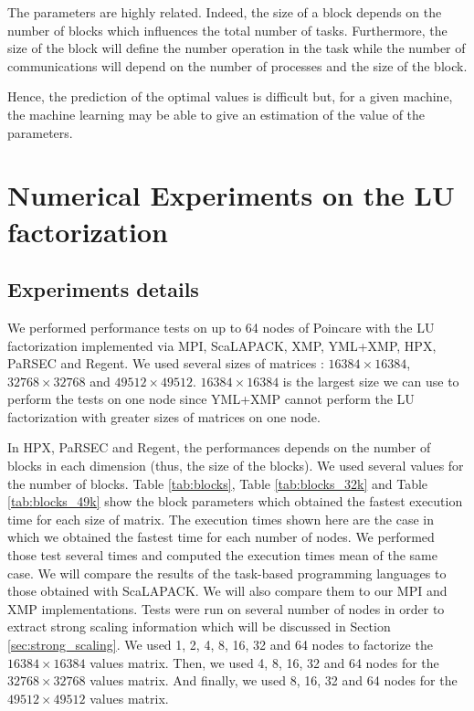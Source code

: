 The parameters are highly related.
Indeed, the size of a block depends on the number of blocks which influences the total number of tasks.
Furthermore, the size of the block will define the number operation in the task while the number of communications will depend on the number of processes and the size of the block.

Hence, the prediction of the optimal values is difficult but, for a given machine, the machine learning may be able to give an estimation of the value of the parameters.

\section{Numerical Experiments on the LU factorization}
\subsection{Experiments details}
We performed performance tests on up to 64 nodes of Poincare with the LU factorization implemented via MPI, ScaLAPACK, XMP, YML+XMP, HPX, PaRSEC and Regent.
We used several sizes of matrices : $16384 \times 16384$, $32768 \times 32768$ and $49512 \times 49512$.
$16384 \times 16384$ is the largest size we can use to perform the tests on one node since YML+XMP cannot perform the LU factorization with greater sizes of matrices on one node.

In HPX, PaRSEC and Regent, the performances depends on the number of blocks in each dimension (thus, the size of the blocks).
We used several values for the number of blocks.
Table \ref{tab:blocks}, Table \ref{tab:blocks_32k} and Table \ref{tab:blocks_49k} show the block parameters which obtained the fastest execution time for each size of matrix.
The execution times shown here are the case in which we obtained the fastest time for each number of nodes.
We performed those test several times and computed the execution times mean of the same case.
We will compare the results of the task-based programming languages to those obtained with ScaLAPACK.
We will also compare them to our MPI and XMP implementations.
Tests were run on several number of nodes in order to extract strong scaling information which will be discussed in Section \ref{sec:strong_scaling}.
We used  1, 2, 4, 8, 16, 32 and 64 nodes to factorize the $16384 \times 16384$ values matrix.
Then, we used 4, 8, 16, 32 and 64 nodes for the $32768 \times 32768$ values matrix.
And finally, we used 8, 16, 32 and 64 nodes for the $49512 \times 49512$ values matrix.


